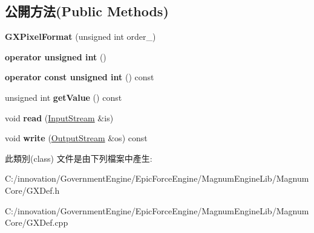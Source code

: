 \subsection*{公開方法(Public Methods)}
\begin{DoxyCompactItemize}
\item 
{\bfseries G\+X\+Pixel\+Format} (unsigned int order\+\_)\hypertarget{class_i_dream_sky_1_1_g_x_pixel_format_ad5534cbaf630f89e408709546bff3764}{}\label{class_i_dream_sky_1_1_g_x_pixel_format_ad5534cbaf630f89e408709546bff3764}

\item 
{\bfseries operator unsigned int} ()\hypertarget{class_i_dream_sky_1_1_g_x_pixel_format_acec2fd54211a199e20e62c686b000549}{}\label{class_i_dream_sky_1_1_g_x_pixel_format_acec2fd54211a199e20e62c686b000549}

\item 
{\bfseries operator const unsigned int} () const \hypertarget{class_i_dream_sky_1_1_g_x_pixel_format_a7765692a2fc8d482f5f98cba93e8c0b1}{}\label{class_i_dream_sky_1_1_g_x_pixel_format_a7765692a2fc8d482f5f98cba93e8c0b1}

\item 
unsigned int {\bfseries get\+Value} () const \hypertarget{class_i_dream_sky_1_1_g_x_pixel_format_aa28ea3373b2bd2c3bcbc3c229503c89f}{}\label{class_i_dream_sky_1_1_g_x_pixel_format_aa28ea3373b2bd2c3bcbc3c229503c89f}

\item 
void {\bfseries read} (\hyperlink{class_i_dream_sky_1_1_input_stream}{Input\+Stream} \&is)\hypertarget{class_i_dream_sky_1_1_g_x_pixel_format_a1e036abbd45fc5009c686abe50815bdc}{}\label{class_i_dream_sky_1_1_g_x_pixel_format_a1e036abbd45fc5009c686abe50815bdc}

\item 
void {\bfseries write} (\hyperlink{class_i_dream_sky_1_1_output_stream}{Output\+Stream} \&os) const \hypertarget{class_i_dream_sky_1_1_g_x_pixel_format_a43a4f1193340b0156a7f77f27ad224e4}{}\label{class_i_dream_sky_1_1_g_x_pixel_format_a43a4f1193340b0156a7f77f27ad224e4}

\end{DoxyCompactItemize}


此類別(class) 文件是由下列檔案中產生\+:\begin{DoxyCompactItemize}
\item 
C\+:/innovation/\+Government\+Engine/\+Epic\+Force\+Engine/\+Magnum\+Engine\+Lib/\+Magnum\+Core/G\+X\+Def.\+h\item 
C\+:/innovation/\+Government\+Engine/\+Epic\+Force\+Engine/\+Magnum\+Engine\+Lib/\+Magnum\+Core/G\+X\+Def.\+cpp\end{DoxyCompactItemize}
